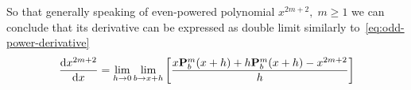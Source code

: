 So that generally speaking of even-powered polynomial $x^{2m+2}, \; m\geq 1$ we can conclude that its derivative
can be expressed as double limit similarly to~\eqref{eq:odd-power-derivative}
\begin{equation*}
    \odv{x^{2m+2}}{x} =\lim_{h \to 0} \lim_{b \to x+h} \left[ \frac{x\polynomialP{m}{b}{x+h} + h\polynomialP{m}{b}{x+h}  - x^{2m+2}}{h} \right]
\end{equation*}
